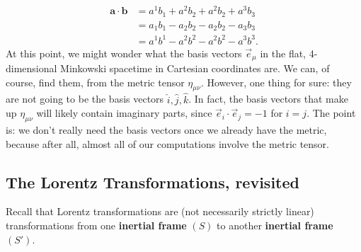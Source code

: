 \documentclass{book}
\theoremstyle{definition}
\begin{document}
\begin{align*}
\mathbf{a}\cdot\mathbf{b} &= a^1b_1 + a^2b_2 + a^2b_2 + a^3b_3\\
&= a_1b_1 - a_2b_2 - a_2b_2 - a_3b_3\\
&= a^1b^1 - a^2b^2 - a^2b^2 - a^3b^3.
\end{align*}
At this point, we might wonder what the basis vectors $\vec{e}_\mu$ in the flat, 4-dimensional Minkowski spacetime in Cartesian coordinates are. We can, of course, find them, from the metric tensor $\eta_{\mu\nu}$. However, one thing for sure: they are not going to be the basis vectors $\hat{i}, \hat{j}, \hat{k}$. In fact, the basis vectors that make up $\eta_{\mu\nu}$ will likely contain imaginary parts, since $\vec{e}_i\cdot\vec{e}_j = -1$ for $i = j$. The point is: we don't really need the basis vectors once we already have the metric, because after all, almost all of our computations involve the metric tensor. 
\subsection{The Lorentz Transformations, revisited} 
Recall that Lorentz transformations are (not necessarily strictly linear) transformations from one \textbf{inertial frame} $(S)$ to another \textbf{inertial frame} $(S')$.\\
\end{document}
